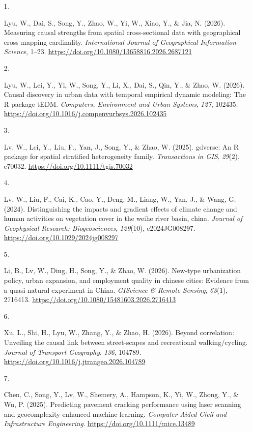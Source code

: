\documentclass[11pt,a4paper,]{awesome-cv}
\newlength{\cslhangindent}
\newlength{\csllabelwidth}
\newenvironment{CSLReferences}[2] %
 {\begin{list}{}{%
  \setlength{\itemindent}{0pt}
  \setlength{\leftmargin}{0pt}
  \setlength{\parsep}{0pt}
  \ifodd #1
   \setlength{\leftmargin}{\cslhangindent}
   \setlength{\itemindent}{-1\cslhangindent}
  \fi
  \setlength{\itemsep}{#2\baselineskip}}}
 {\end{list}}
\newcommand{\CSLLeftMargin}[1]{\parbox[t]{\csllabelwidth}{\strut#1\strut}}
\newcommand{\CSLRightInline}[1]{\parbox[t]{\linewidth - \csllabelwidth}{\strut#1\strut}}
\begin{document}
\label{refs-d23da96b40208019b6f3580b0fc3c15f}
\begin{CSLReferences}{0}{0}
\CSLLeftMargin{1. }%
\CSLRightInline{Lyu, W., Dai, S., Song, Y., Zhao, W., Yi, W., Xiao, Y.,
\& Jia, N. (2026). Measuring causal strengths from spatial
cross-sectional data with geographical cross mapping cardinality.
\emph{International Journal of Geographical Information Science}, 1--23.
\url{https://doi.org/10.1080/13658816.2026.2687121}}

\CSLLeftMargin{2. }%
\CSLRightInline{Lyu, W., Lei, Y., Yi, W., Song, Y., Li, X., Dai, S.,
Qin, Y., \& Zhao, W. (2026). Causal discovery in urban data with
temporal empirical dynamic modeling: The R package tEDM.
\emph{Computers, Environment and Urban Systems}, \emph{127}, 102435.
\url{https://doi.org/10.1016/j.compenvurbsys.2026.102435}}

\CSLLeftMargin{3. }%
\CSLRightInline{Lv, W., Lei, Y., Liu, F., Yan, J., Song, Y., \& Zhao, W.
(2025). gdverse: An R package for spatial stratified heterogeneity
family. \emph{Transactions in GIS}, \emph{29}(2), e70032.
\url{https://doi.org/10.1111/tgis.70032}}

\CSLLeftMargin{4. }%
\CSLRightInline{Lv, W., Liu, F., Cai, K., Cao, Y., Deng, M., Liang, W.,
Yan, J., \& Wang, G. (2024). Distinguishing the impacts and gradient
effects of climate change and human activities on vegetation cover in
the weihe river basin, china. \emph{Journal of Geophysical Research:
Biogeosciences}, \emph{129}(10), e2024JG008297.
\url{https://doi.org/10.1029/2024jg008297}}

\CSLLeftMargin{5. }%
\CSLRightInline{Li, B., Lv, W., Ding, H., Song, Y., \& Zhao, W. (2026).
New-type urbanization policy, urban expansion, and employment quality in
chinese cities: Evidence from a quasi-natural experiment in China.
\emph{GIScience \& Remote Sensing}, \emph{63}(1), 2716413.
\url{https://doi.org/10.1080/15481603.2026.2716413}}

\CSLLeftMargin{6. }%
\CSLRightInline{Xu, L., Shi, H., Lyu, W., Zhang, Y., \& Zhao, H. (2026).
Beyond correlation: Unveiling the causal link between street-scapes and
recreational walking/cycling. \emph{Journal of Transport Geography},
\emph{136}, 104789.
\url{https://doi.org/10.1016/j.jtrangeo.2026.104789}}

\CSLLeftMargin{7. }%
\CSLRightInline{Chen, C., Song, Y., Lv, W., Shemery, A., Hampson, K.,
Yi, W., Zhong, Y., \& Wu, P. (2025). Predicting pavement cracking
performance using laser scanning and geocomplexity‐enhanced machine
learning. \emph{Computer-Aided Civil and Infrastructure Engineering}.
\url{https://doi.org/10.1111/mice.13489}}

\end{CSLReferences}
\end{document}
